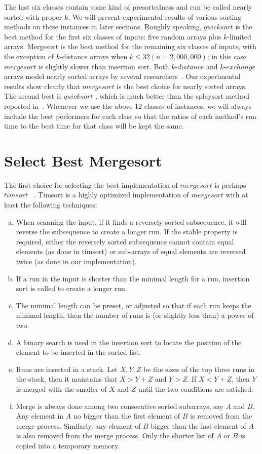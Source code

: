 \documentclass[AMA,STIX1COL]{WileyNJD-v2}
\newcommand{\kdis}{$k$-$distance$ }
\newcommand{\kexc}{$k$-$exchange$ }
\newcommand{\qusort}{$quicksort$ }
\newcommand{\tsort}{$timsort$ }
\newcommand{\msort}{$mergesort$ }
\begin{document}
The last six classes contain some kind of presortedness and can be called nearly sorted with proper $k$. 
We will present experimental results of various sorting methods on these instances in later sections.  
Roughly speaking, \qusort is the best method for the first six classes of inputs: five random arrays plus $k$-limited arrays. 
Mergesort is the best method for the remaining six classes of inputs, with the exception of $k$-distance arrays when $k \leq 32 (n = 2,000,000)$; in this case \msort is slightly slower than insertion sort. 
Both \kdis and \kexc arrays model nearly sorted arrays by several researchers~\cite{cook1980best}. 
Our experimental results show clearly that \msort is the best choice for nearly sorted arrays. 
The second best is \qusort, which is much better than the splaysort method reported in~\cite{moffat1996splaysort}. 
Whenever we use the above 12 classes of instances, we will always include the best performers for each class so that the ratios of each method’s run time to the best time for that class will be kept the same.             

\section{Select Best Mergesort}        
The first choice for selecting the best implementation of \msort is perhaps \tsort~\cite{timsort}. Timsort is a highly optimized implementation of \msort with at least the following techniques:
\begin{enumerate}[(a)]
\item When scanning the input, if it finds a reversely sorted subsequence, it will reverse the subsequence to create a longer run. If the stable property is required, either the reversely sorted subsequence cannot contain equal elements (as done in timsort) or sub-arrays of equal elements are reversed twice (as done in our implementation).
\item If a run in the input is shorter than the minimal length for a run, insertion sort is called to create a longer run. 
\item The minimal length can be preset, or adjusted so that if each run keeps the minimal length, then the number of runs is (or slightly less than) a power of two.
\item A binary search is used in the insertion sort to locate the position of the element to be inserted in the sorted list.
\item Runs are inserted in a stack. Let $X, Y, Z$ be the sizes of the top three runs in the stack, then it maintains that $X > Y+Z$ and $Y > Z$.  
If $X < Y+Z$, then $Y$ is merged with the smaller of $X$ and $Z$ until the two conditions are satisfied. 
\item Merge is always done among two consecutive sorted subarrays, say $A$ and $B$. 
Any element in $A$ no bigger than the first element of $B$ is removed from the merge process. 
Similarly, any element of $B$ bigger than the last element of $A$ is also removed from the merge process. 
Only the shorter list of $A$ or $B$ is copied into a temporary memory. 
\end{enumerate}
\end{document}
